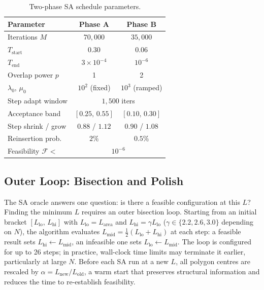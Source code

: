 \documentclass[10pt,twocolumn]{article}
\begin{document}
\begin{table}[t]
\centering\small
\setlength{\tabcolsep}{4.5pt}
\caption{Two-phase SA schedule parameters.}
\label{tab:sa}
\begin{tabular}{lcc}
\toprule
Parameter & Phase A & Phase B \\
\midrule
Iterations $M$                & $70{,}000$       & $35{,}000$ \\
$T_{\mathrm{start}}$          & $0.30$           & $0.06$ \\
$T_{\mathrm{end}}$            & $3\times10^{-4}$ & $10^{-6}$ \\
Overlap power $p$             & 1                & 2 \\
$\lambda_0,\,\mu_0$           & $10^2$ (fixed)   & $10^3$ (ramped) \\
Step adapt window             & \multicolumn{2}{c}{$1{,}500$ iters} \\
Acceptance band               & $[0.25,\,0.55]$  & $[0.10,\,0.30]$ \\
Step shrink / grow            & $0.88$ / $1.12$  & $0.90$ / $1.08$ \\
Reinsertion prob.             & $2\%$            & $0.5\%$ \\
Feasibility $\mathcal{F} <$   & \multicolumn{2}{c}{$10^{-6}$} \\
\bottomrule
\end{tabular}
\end{table}

\subsection{Outer Loop: Bisection and Polish}

The SA oracle answers one question: is there a feasible configuration
at this $L$? Finding the minimum $L$ requires an outer bisection loop.
Starting from an initial bracket $[L_{\mathrm{lo}},\,L_{\mathrm{hi}}]$
with $L_{\mathrm{lo}} = L_{\mathrm{area}}$ and
$L_{\mathrm{hi}} = \gamma L_{\mathrm{lo}}$ ($\gamma \in \{2.2, 2.6,
3.0\}$ depending on $N$), the algorithm evaluates
$L_{\mathrm{mid}} = \tfrac{1}{2}(L_{\mathrm{lo}} + L_{\mathrm{hi}})$
at each step: a feasible result sets $L_{\mathrm{hi}} \leftarrow
L_{\mathrm{mid}}$, an infeasible one sets $L_{\mathrm{lo}} \leftarrow
L_{\mathrm{mid}}$. The loop is configured for up to 26 steps; in
practice, wall-clock time limits may terminate it earlier, particularly
at large $N$. Before each SA run at a new $L$, all polygon centres are
rescaled by $\alpha = L_{\mathrm{new}}/L_{\mathrm{old}}$, a warm
start that preserves structural information and reduces the time to
re-establish feasibility.
\end{document}
